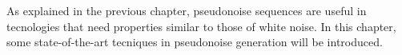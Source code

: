As explained in the previous chapter, pseudonoise sequences are useful in
tecnologies that need properties similar to those of white noise. In this
chapter, some state-of-the-art tecniques in pseudonoise generation
will be introduced.





